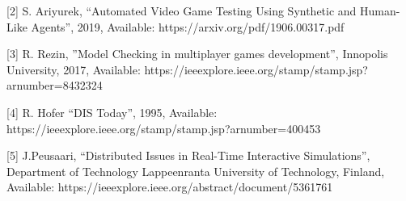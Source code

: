 \documentclass[conference]{IEEEtran}
\begin{document}
[2] S. Ariyurek, “Automated Video Game Testing Using
Synthetic and Human-Like Agents”, 2019, Available: https://arxiv.org/pdf/1906.00317.pdf

[3] R. Rezin, ”Model Checking in multiplayer games development”, Innopolis University,
2017, Available: https://ieeexplore.ieee.org/stamp/stamp.jsp?arnumber=8432324

[4] R. Hofer “DIS Today”, 1995, Available:
https://ieeexplore.ieee.org/stamp/stamp.jsp?arnumber=400453

[5] J.Peusaari, “Distributed Issues in Real-Time Interactive Simulations”, Department of Technology Lappeenranta University of Technology, Finland,
 Available: https://ieeexplore.ieee.org/abstract/document/5361761
\end{document}
